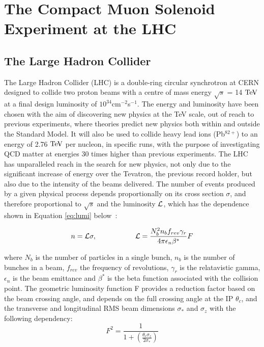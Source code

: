 \chapter{The Compact Muon Solenoid Experiment at the LHC}
\label{ch:detector}
\section{The Large Hadron Collider}

The Large Hadron Collider (LHC) is a double-ring circular synchrotron at CERN designed to collide two proton beams with a centre of mass energy $\sqrt{s}$  = 14 $\text{TeV}$ at a final design luminosity of $10^{34}$cm$^{-2}$s$^{-1}$. The energy and luminosity have been chosen with the aim of discovering new physics at the TeV scale, out of reach to previous experiments, where theories predict new physics both within and outside the Standard Model. It will also be used to collide heavy lead ions (Pb$^{82+}$) to an energy of 2.76 $\text{TeV}$  per nucleon, in specific runs, with the purpose of investigating QCD matter at energies 30 times higher than previous experiments. 
The LHC has unparalleled reach in the search for new physics, not only due to the significant increase of energy over the Tevatron, the previous record holder, but also due to the intensity of the beams delivered. The number of events produced by a given physical process depends proportionally on its cross section $\sigma$, and therefore proportional to $\sqrt{s}$ and the luminosity $\mathcal{L}$, which has the dependence shown in Equation \ref{eq:lumi} below~\cite{LHCDesign}:

\begin{equation}
n = \mathcal{L} \sigma, \hspace{.75in} \mathcal{L} = \frac{N_{b}^{2} n_{b} f_{rev} \gamma_{r}}{4 \pi \epsilon_{n} \beta^{*}}F
\label{eq:lumi}
\end{equation}

where $N_{b}$ is the number of particles in a single bunch, $n_{b}$ is the number of bunches in a beam, $f_{rev}$ the frequency of revolutions, $\gamma_{r}$ is the relatavistic gamma, $\epsilon_{n}$ is the beam emittance and $\beta^{*}$ is the beta function associated with the collision point. The geometric luminosity function F provides a reduction factor based on the beam crossing angle, and depends on the full crossing angle at the IP $\theta_{c}$, and the transverse and longitudinal RMS beam dimensions $\sigma_{*}$ and $\sigma_{z}$ with the following dependency:
\begin{equation}
F^{2} = \frac{1}{1+(\frac{\theta_{c} \sigma_{z}}{2\sigma_{*}})}
\label{eq:lumi2}
\end{equation}

